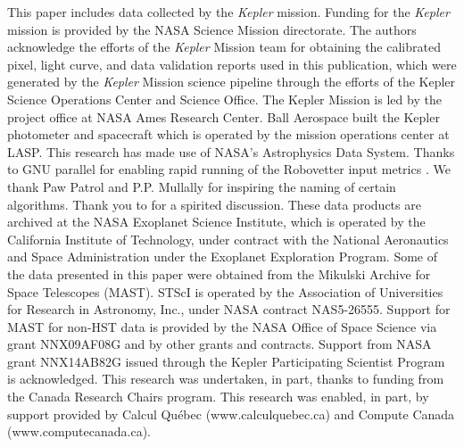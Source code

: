 \documentclass[twocolumn,tighten]{aastex61}
\renewcommand{\_}{\discretionary{\underscore}{}{\underscore}}  %
\newcommand\Kepler{\textit{Kepler}}
\begin{document}













\acknowledgments
This paper includes data collected by the \Kepler{} mission. Funding for the \Kepler{} mission is provided by the NASA Science Mission directorate. The authors acknowledge the efforts of the \Kepler{} Mission team for obtaining the calibrated pixel, light curve, and data validation reports used in this publication, which were generated by the \Kepler{} Mission science pipeline through the efforts of the Kepler Science Operations Center and Science Office. The Kepler Mission is led by the project office at NASA Ames Research Center. Ball Aerospace built the Kepler photometer and spacecraft which is operated by the mission operations center at LASP.  This research has made use of NASA's Astrophysics Data System.  Thanks to GNU parallel for enabling rapid running of the Robovetter input metrics \citep{Tange2011a}. We thank Paw Patrol and P.P. Mullally for inspiring the naming of certain algorithms. Thank you to \citet{Turbo-King2017} for a spirited discussion. These data products are archived at the NASA Exoplanet Science Institute, which is operated by the California Institute of Technology, under contract with the National Aeronautics and Space Administration under the Exoplanet Exploration Program. Some of the data presented in this paper were obtained from the Mikulski Archive for Space Telescopes (MAST). STScI is operated by the Association of Universities for Research in Astronomy, Inc., under NASA contract NAS5-26555. Support for MAST for non-HST data is provided by the NASA Office of Space Science via grant NNX09AF08G and by other grants and contracts.  Support from NASA grant NNX14AB82G issued through the Kepler Participating Scientist Program is acknowledged. This research was undertaken, in part, thanks to funding from the Canada Research Chairs program. This research was enabled, in part, by support provided by Calcul Qu\'{e}bec (www.calculquebec.ca) and Compute Canada (www.computecanada.ca). 
\end{document}
